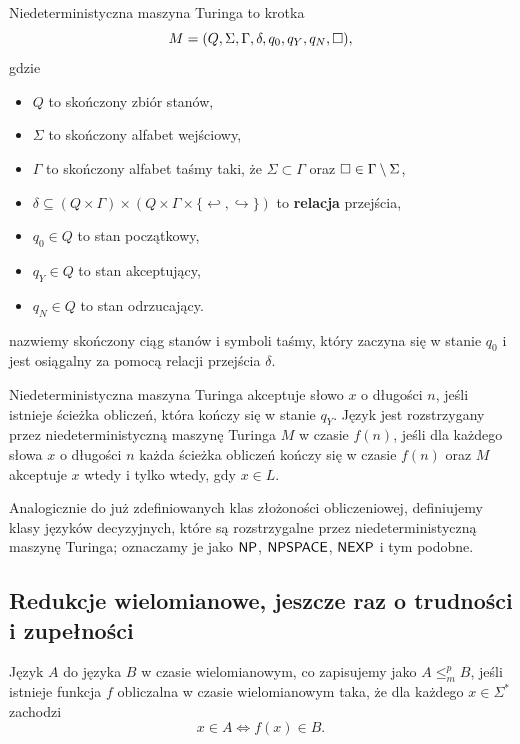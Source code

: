\begin{definition}
    Niedeterministyczna maszyna Turinga to krotka
    \[ M = (Q, \Sigma, \Gamma, \delta, q_0, q_Y, q_N, \square),\]
    gdzie
    \begin{itemize}[noitemsep]
        \item $Q$ to skończony zbiór stanów,
        \item $\Sigma$ to skończony alfabet wejściowy,
        \item $\Gamma$ to skończony alfabet taśmy taki, że $\Sigma \subset \Gamma$ oraz $\square \in \Gamma \setminus \Sigma$,
        \item $\delta \subseteq \left(Q \times \Gamma\right) \times \left(Q \times \Gamma \times \{\hookleftarrow , \hookrightarrow\}\right)$ to \textbf{relacja}  przejścia,
        \item $q_0 \in Q$ to stan początkowy,
        \item $q_Y \in Q$ to stan akceptujący,
        \item $q_N \in Q$ to stan odrzucający.
    \end{itemize}

     nazwiemy skończony ciąg stanów i symboli taśmy, który zaczyna się w stanie $q_0$ i jest osiągalny za pomocą relacji przejścia $\delta$.

    Niedeterministyczna maszyna Turinga akceptuje słowo $x$ o długości $n$, jeśli istnieje ścieżka obliczeń, która kończy się w stanie $q_Y$. Język jest rozstrzygany przez niedeterministyczną maszynę Turinga $M$ w czasie $f(n)$, jeśli dla każdego słowa $x$ o długości $n$ każda ścieżka obliczeń kończy się w czasie $f(n)$ oraz $M$ akceptuje $x$ wtedy i tylko wtedy, gdy $x \in L$.
\end{definition}

Analogicznie do już zdefiniowanych klas złożoności obliczeniowej, definiujemy klasy języków decyzyjnych, które są rozstrzygalne przez niedeterministyczną maszynę Turinga; oznaczamy je jako $\textsf{NP}$, $\textsf{NPSPACE}$, $\textsf{NEXP}$ i tym podobne.

\subsection{Redukcje wielomianowe, jeszcze raz o trudności i zupełności}

\begin{definition}
    Język $A$  do języka $B$ w czasie wielomianowym, co zapisujemy jako $A \leq_m^p B$, jeśli istnieje funkcja $f$ obliczalna w czasie wielomianowym taka, że dla każdego $x \in \Sigma^*$ zachodzi
    \[ x \in A \iff f(x) \in B. \]
\end{definition}

